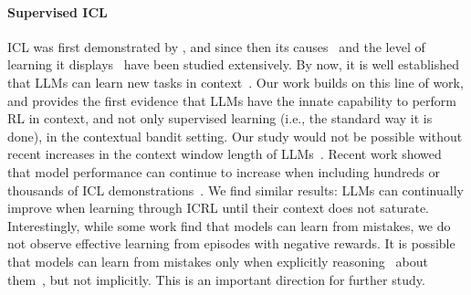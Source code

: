 \documentclass{article}
\theoremstyle{plain}
\theoremstyle{definition}
\theoremstyle{remark}
\begin{document}
\paragraph{Supervised ICL}
ICL was first demonstrated by \citet{brown2020language}, and since then its causes~\citep{chan_data_2022, xie2022explanationincontextlearningimplicit, olsson2022incontextlearninginductionheads, garg2022transformers, pmlr-v202-von-oswald23a, hendel-etal-2023-context, wang2023labelwordsanchorsinformation} and the level of learning it displays~\citep{min2022rethinking, lyu-etal-2023-z} have been studied extensively.
By now, it is well established that LLMs can learn new tasks in context~\citep{garg2022transformers, wei2023largerlanguagemodelsincontext, pan-etal-2023-context, kossen2024incontextlearninglearnslabel, li2024languagemodelslearncontext}.
Our work builds on this line of work, and provides the first evidence that LLMs have the innate capability to perform RL in context, and not only supervised learning (i.e., the standard way it is done), in the contextual bandit setting.
Our study would not be possible without recent increases in the context window length of LLMs~\citep{dubey2024llama, abdin2024phi3technicalreporthighly, geminiteam2024geminifamilyhighlycapable}.
Recent work showed that model performance can continue to increase when including hundreds or thousands of ICL demonstrations~\citep{bertsch2024incontext, agarwal2024manyshotincontextlearning}. We find similar results: LLMs can continually improve when learning through ICRL until their context does not saturate. Interestingly, while some work \citep{zhang2024incontextprinciplelearningmistakes, mo2024ciclcontrastiveincontextlearning, shinn2024reflexion} find that models can learn from mistakes, we do not observe effective learning from episodes with negative rewards.
It is possible that models can learn from mistakes only when explicitly reasoning~\citep{kojima2022large, wei2022chainofthought} about them~\citep{shinn2024reflexion, zhang2024incontextprinciplelearningmistakes}, but not implicitly. This is an important direction for further study.
\end{document}

